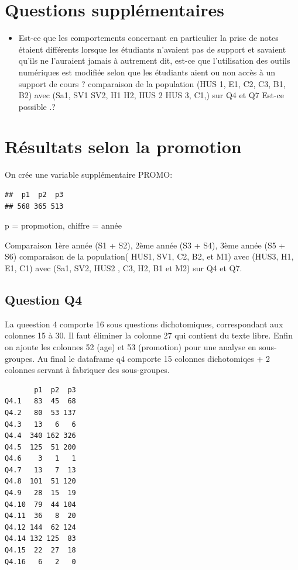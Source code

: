\documentclass[]{article}
\begin{document}
\section{Questions supplémentaires}\label{questions-supplementaires}

\begin{itemize}
\itemsep1pt\parskip0pt
\item
  Est-ce que les comportements concernant en particulier la prise de
  notes étaient différents lorsque les étudiants n'avaient pas de
  support et savaient qu'ils ne l'auraient jamais à autrement dit,
  est-ce que l'utilisation des outils numériques est modifiée selon que
  les étudiants aient ou non accès à un support de cours ? comparaison
  de la population (HUS 1, E1, C2, C3, B1, B2) avec (Sa1, SV1 SV2, H1
  H2, HUS 2 HUS 3, C1,) sur Q4 et Q7 Est-ce possible .?
\end{itemize}

\section{Résultats selon la
promotion}\label{resultats-selon-la-promotion}

On crée une variable supplémentaire PROMO:

\begin{verbatim}
##  p1  p2  p3 
## 568 365 513
\end{verbatim}

p = propmotion, chiffre = année

Comparaison 1ère année (S1 + S2), 2ème année (S3 + S4), 3ème année (S5 +
S6) comparaison de la population( HUS1, SV1, C2, B2, et M1) avec (HUS3,
H1, E1, C1) avec (Sa1, SV2, HUS2 , C3, H2, B1 et M2) sur Q4 et Q7.

\subsection{Question Q4}\label{question-q4}

La queestion 4 comporte 16 sous questions dichotomiques, correspondant
aux colonnes 15 à 30. Il faut éliminer la colonne 27 qui contient du
texte libre. Enfin on ajoute les colonnes 52 (age) et 53 (promotion)
pour une analyse en sous-groupes. Au final le dataframe q4 comporte 15
colonnes dichotomiqes + 2 colonnes servant à fabriquer des sous-groupes.

\begin{verbatim}
       p1  p2  p3
Q4.1   83  45  68
Q4.2   80  53 137
Q4.3   13   6   6
Q4.4  340 162 326
Q4.5  125  51 200
Q4.6    3   1   1
Q4.7   13   7  13
Q4.8  101  51 120
Q4.9   28  15  19
Q4.10  79  44 104
Q4.11  36   8  20
Q4.12 144  62 124
Q4.14 132 125  83
Q4.15  22  27  18
Q4.16   6   2   0
\end{verbatim}
\end{document}
